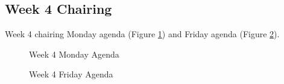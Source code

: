 \documentclass[11pt, a4, nocenter, margin=150mm]{article}
\begin{document}
\begin{appendices}
\pagebreak

\section{Week 4 Chairing}
\label{app:week4_chair}

	Week 4 chairing Monday agenda (Figure \ref{fig:week4_agenda1}) and Friday agenda (Figure \ref{fig:week4_agenda2}).

	\begin{figure}[h!]
		\centering
		\caption{Week 4 Monday Agenda}
		\label{fig:week4_agenda1}
	\end{figure}

	\begin{figure}[h!]
		\centering
		\caption{Week 4 Friday Agenda}
		\label{fig:week4_agenda2}
	\end{figure}

\pagebreak


\end{appendices}
\end{document}
